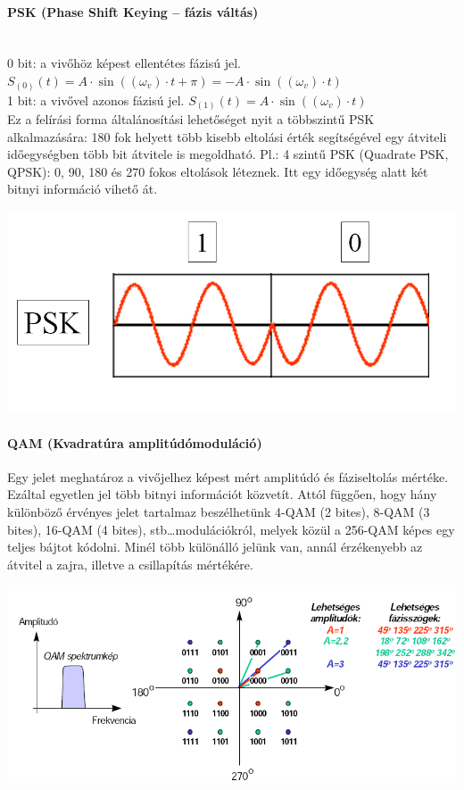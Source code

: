 \begin{multicols}{2}
\paragraph{PSK (Phase Shift Keying -- fázis váltás)} ~\\
0 bit: a vivőhöz képest ellentétes fázisú jel. $S_{(0)}(t) = A\cdot\sin((\omega_v)\cdot t+\pi)= -A\cdot\sin((\omega_v)\cdot t) $\\
1 bit: a vivővel azonos fázisú jel. $S_{(1)}(t) = A\cdot\sin((\omega_v)\cdot t)$\\
Ez a felírási forma általánosítási lehetőséget nyit a többszintű PSK alkalmazására: 180 fok helyett több kisebb eltolási érték segítségével egy átviteli időegységben több bit átvitele is megoldható.
Pl.: 4 szintű PSK (Quadrate PSK, QPSK): 0, 90, 180 és 270 fokos eltolások léteznek. Itt egy időegység alatt két bitnyi információ vihető át.
\begin{center}
	\includegraphics[width=\linewidth]{fig/12-PSK}
\end{center}
\end{multicols}

\paragraph{QAM (Kvadratúra amplitúdómoduláció)}
Egy jelet meghatároz a vivőjelhez képest mért amplitúdó és fáziseltolás mértéke. Ezáltal egyetlen jel több bitnyi információt közvetít. Attól függően, hogy hány különböző érvényes jelet tartalmaz beszélhetünk 4-QAM (2 bites), 8-QAM (3 bites), 16-QAM (4 bites), stb\dots modulációkról, melyek közül a 256-QAM képes egy teljes bájtot kódolni. Minél több különálló jelünk van, annál érzékenyebb az átvitel a zajra, illetve a csillapítás mértékére.
\begin{center}
	\includegraphics[width=0.7\linewidth]{fig/12-QAM}
\end{center}


